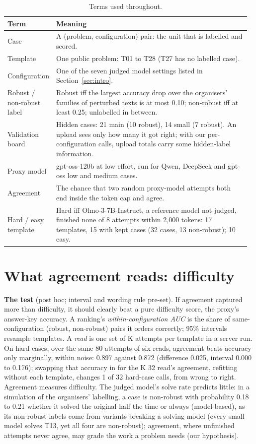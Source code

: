 \documentclass{article}
\begin{document}
\begin{table}[t]
\caption{Terms used throughout.}
\label{tab:terms}
\centering
\small
\setlength{\tabcolsep}{4pt}
\begin{tabular}{@{}p{0.15\linewidth}p{0.82\linewidth}@{}}
\toprule
Term & Meaning \\
\midrule
Case & A (problem, configuration) pair: the unit that is labelled and scored. \\
Template & One public problem: T01 to T28 (T27 has no labelled case). \\
Configuration & One of the seven judged model settings listed in Section~\ref{sec:intro}. \\
Robust / non-robust label & Robust iff the largest accuracy drop over the organisers' families of perturbed texts is
at most 0.10; non-robust iff at least 0.25; unlabelled in between. \\
Validation board & Hidden cases: 21 main (10 robust), 14 small (7 robust). An upload sees only how many it got right;
with our per-configuration calls, upload totals carry some hidden-label information. \\
Proxy model & gpt-oss-120b at low effort, run for Qwen, DeepSeek and gpt-oss low and medium cases. \\
Agreement & The chance that two random proxy-model attempts both end inside the token cap and agree. \\
Hard / easy template & Hard iff Olmo-3-7B-Instruct, a reference model not judged, finished none of 8 attempts
within 2,000 tokens: 17 templates, 15 with kept cases (32 cases, 13 non-robust); 10 easy. \\
\bottomrule
\end{tabular}
\end{table}

\section{What agreement reads: difficulty}
\label{sec:label}

\textbf{The test} (post hoc; interval and wording rule pre-set). If agreement captured more than difficulty, it should
clearly beat a pure difficulty score, the proxy's answer-key accuracy. A ranking's \emph{within-configuration AUC} is
the share of same-configuration (robust, non-robust) pairs it orders correctly; 95\% intervals resample templates. A
\emph{read} is one set of K attempts per template in a server run. On hard cases, over the same 80 attempts of six
reads, agreement beats accuracy only marginally, within noise: 0.897 against 0.872 (difference 0.025, interval 0.000
to 0.176); swapping that accuracy in for the K 32 read's agreement, refitting without each template, changes 1 of 32
hard-case calls, from wrong to right. Agreement measures difficulty. The judged model's solve rate predicts little: in
a simulation of the organisers' labelling, a case is non-robust with probability 0.18 to 0.21 whether it solved the
original half the time or always (model-based), as its non-robust labels come from variants breaking a solving model
(every small model solves T13, yet all four are non-robust); agreement, where unfinished attempts never agree, may
grade the work a problem needs (our hypothesis).
\end{document}
